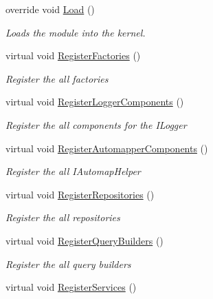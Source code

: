\begin{DoxyCompactItemize}
override void \hyperlink{classCqrs_1_1Ninject_1_1Configuration_1_1CqrsModule_a8cf4c81c21496699b2f32112b23308fe_a8cf4c81c21496699b2f32112b23308fe}{Load} ()
\begin{DoxyCompactList}\small\item\em Loads the module into the kernel. \end{DoxyCompactList}\item 
virtual void \hyperlink{classCqrs_1_1Ninject_1_1Configuration_1_1CqrsModule_afae0f84460f7cf9d1f9b62ec148b02ad_afae0f84460f7cf9d1f9b62ec148b02ad}{Register\+Factories} ()
\begin{DoxyCompactList}\small\item\em Register the all factories \end{DoxyCompactList}\item 
virtual void \hyperlink{classCqrs_1_1Ninject_1_1Configuration_1_1CqrsModule_a7bb448b4c38d7a4628a30ba709dc8a36_a7bb448b4c38d7a4628a30ba709dc8a36}{Register\+Logger\+Components} ()
\begin{DoxyCompactList}\small\item\em Register the all components for the I\+Logger \end{DoxyCompactList}\item 
virtual void \hyperlink{classCqrs_1_1Ninject_1_1Configuration_1_1CqrsModule_a5c3b6741270b2cb16aa1a1a84c57041b_a5c3b6741270b2cb16aa1a1a84c57041b}{Register\+Automapper\+Components} ()
\begin{DoxyCompactList}\small\item\em Register the all I\+Automap\+Helper \end{DoxyCompactList}\item 
virtual void \hyperlink{classCqrs_1_1Ninject_1_1Configuration_1_1CqrsModule_a3437afb1ea306ff4e65eb2ca22a276d9_a3437afb1ea306ff4e65eb2ca22a276d9}{Register\+Repositories} ()
\begin{DoxyCompactList}\small\item\em Register the all repositories \end{DoxyCompactList}\item 
virtual void \hyperlink{classCqrs_1_1Ninject_1_1Configuration_1_1CqrsModule_afc0f6417f69d5424fe7bba7a6724970f_afc0f6417f69d5424fe7bba7a6724970f}{Register\+Query\+Builders} ()
\begin{DoxyCompactList}\small\item\em Register the all query builders \end{DoxyCompactList}\item 
virtual void \hyperlink{classCqrs_1_1Ninject_1_1Configuration_1_1CqrsModule_ac6f0db82440e24190a5692d352fb4524_ac6f0db82440e24190a5692d352fb4524}{Register\+Services} ()

\end{DoxyCompactItemize}
